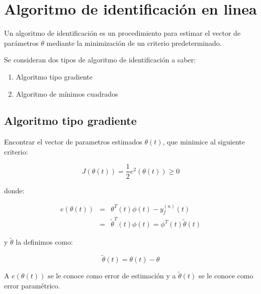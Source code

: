 
    \newpage
    \section{Algoritmo de identificación en linea}

        Un algoritmo de identificación es un procedimiento para estimar el vector de parámetros $\theta$ mediante la minimización de un criterio predeterminado.

        Se consideran dos tipos de algoritmo de identificación a saber:

        \begin{enumerate}
            \item Algoritmo tipo gradiente
            \item Algoritmo de mínimos cuadrados
        \end{enumerate}


        \subsection{Algoritmo tipo gradiente}

            \begin{problema}
                Encontrar el vector de parametros estimados $\theta(t)$, que minimice al siguiente criterio:

                \begin{equation}
                    J \left( \theta(t) \right) = \frac{1}{2} e^2 \left( \theta(t) \right) \ge 0
                \end{equation}

                donde:

                \begin{eqnarray}
                    e \left( \theta(t) \right) & = & \theta^T(t) \phi(t) - y_f^{(n)}(t) \nonumber \\
                    & = & \tilde{\theta}^T(t) \phi(t) = \phi^T(t) \tilde{\theta}(t)
                \end{eqnarray}

                y $\tilde{\theta}$ la definimos como:

                \begin{equation}
                    \tilde{\theta}(t) = \theta(t) - \theta
                \end{equation}

                A $e \left( \theta(t) \right)$ se le conoce como error de estimación y a $\tilde{\theta}(t)$ se le conoce como error paramétrico.
            \end{problema}

